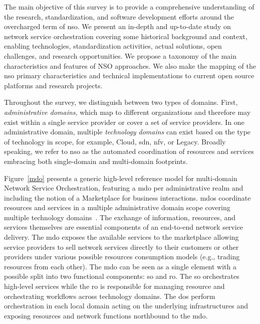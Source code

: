 The main objective of this survey is to provide a comprehensive understanding of the research, standardization, and software development efforts around the overcharged term of  \acrlong{nso}. We present an in-depth and up-to-date study on network service orchestration covering some historical background and context, enabling technologies, standardization activities, actual solutions, open challenges, and research opportunities. We propose a taxonomy of the main characteristics and features of NSO approaches. We also make the mapping of the \gls{nso} primary characteristics and technical implementations to current open source platforms and research projects.    

Throughout the survey, we distinguish between two types of domains. First, \textit{administrative domains}, which map to different organizations and therefore may exist within a single service provider or cover a set of service providers. In one administrative domain, multiple \textit{technology domains} can exist based on the type of technology in scope, for example, Cloud, \gls{sdn}, \gls{nfv}, or Legacy. 
Broadly speaking, we refer to \gls{nso} as the automated coordination of resources and services embracing both single-domain and multi-domain footprints.  

Figure~\ref{mdo} presents a generic high-level reference model for multi-domain Network Service Orchestration, featuring a \gls{mdo} per administrative realm and including the notion of a Marketplace for business interactions. 
\glspl{mdo} coordinate resources and services in a multiple administrative domain scope covering multiple technology domains~\cite{5GPPPArchitectureWorkingGroup2016ViewArchitecture}. 
The exchange of information, resources, and services themselves are essential components of an end-to-end network service delivery.  The \gls{mdo} exposes the available services to the marketplace allowing service providers to sell network services directly to their customers or other providers under various possible resources consumption models (e.g., trading resources from each other). 
The \gls{mdo} can be seen as a single element with a possible split into two functional components: \gls{so} and \gls{ro}. The \gls{so} orchestrates high-level services while the \gls{ro} is responsible for managing resource and orchestrating workflows across technology domains. 
The \glspl{do} perform orchestration in each local domain acting on the underlying infrastructures and exposing resources and network functions northbound to the \gls{mdo}. 

